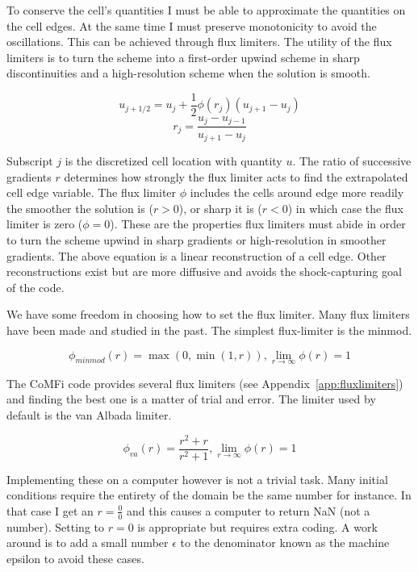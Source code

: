 \documentclass[12pt,upcase]{umlthesis}
\begin{document}
To conserve the cell's quantities I must be able to approximate the quantities on the cell edges. At the same time I must preserve monotonicity to avoid the oscillations. This can be achieved through flux limiters. The utility of the flux limiters is to turn the scheme into a first-order upwind scheme in sharp discontinuities and a high-resolution scheme when the solution is smooth.

\begin{equation}\label{eq:fluxlimiter}
	u_{j+1/2} = u_j + \frac{1}{2} \phi(r_j) (u_{j+1} - u_j)
\end{equation}
\begin{equation}
	r_j = \frac{u_j - u_{j-1}}{u_{j+1} - u_j}
\end{equation}

Subscript $j$ is the discretized cell location with quantity $u$. The ratio of successive gradients $r$ determines how strongly the flux limiter acts to find the extrapolated cell edge variable. The flux limiter $\phi$ includes the cells around edge more readily the smoother the solution is ($r>0$), or sharp it is ($r<0$) in which case the flux limiter is zero ($\phi=0$). These are the properties flux limiters must abide in order to turn the scheme upwind in sharp gradients or high-resolution in smoother gradients. The above equation is a linear reconstruction of a cell edge. Other reconstructions exist but are more diffusive and avoids the shock-capturing goal of the code.

We have some freedom in choosing how to set the flux limiter. Many flux limiters have been made and studied in the past. The simplest flux-limiter is the minmod.

\begin{equation}\label{eq:minmod}
	\phi_{minmod}(r) = \max(0, \min(1, r)), \lim_{r \to \infty} \phi(r) = 1
\end{equation}

The CoMFi code provides several flux limiters (see Appendix~\ref{app:fluxlimiters}) and finding the best one is a matter of trial and error. The limiter used by default is the van Albada limiter.

\begin{equation}\label{eq:vanalbada}
	\phi_{va}(r) = \frac{r^2 + r}{r^2 + 1}, \lim_{r \to \infty} \phi(r) = 1
\end{equation}

Implementing these on a computer however is not a trivial task. Many initial conditions require the entirety of the domain be the same number for instance. In that case I get an $r = \frac{0}{0}$ and this causes a computer to return NaN (not a number). Setting to $r=0$ is appropriate but requires extra coding. A work around is to add a small number $\epsilon$ to the denominator known as the machine epsilon to avoid these cases.
\end{document}
